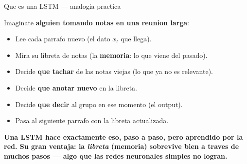 \documentclass[aspectratio=169, 11pt]{beamer}
\begin{document}
\begin{frame}[shrink]{Que es una LSTM --- analogia practica}
  \begin{tcolorbox}[colback=arcaGray, colframe=arcaRed, leftrule=3pt,
    boxrule=0pt, sharp corners, left=8pt, right=8pt, top=6pt, bottom=6pt]
    {\small\color{arcaDark}
    Imaginate \textbf{alguien tomando notas en una reunion larga}:\par}
    \vspace{4pt}
    \begin{itemize}\setlength{\itemsep}{4pt}
      \footnotesize
      \item Lee cada parrafo nuevo (el dato $x_t$ que llega).
      \item Mira su libreta de notas (la \textbf{memoria}: lo que viene del pasado).
      \item Decide \textbf{que tachar} de las notas viejas (lo que ya no es relevante).
      \item Decide \textbf{que anotar nuevo} en la libreta.
      \item Decide \textbf{que decir} al grupo en ese momento (el output).
      \item Pasa al siguiente parrafo con la libreta actualizada.
    \end{itemize}
  \end{tcolorbox}
  \vspace{6pt}
  \begin{tcolorbox}[colback=arcaRed!8, colframe=arcaRed, leftrule=3pt,
    boxrule=0pt, sharp corners, left=8pt, right=8pt, top=4pt, bottom=4pt]
    {\small\color{arcaDark}\bfseries
    Una LSTM hace exactamente eso, paso a paso, pero aprendido por la red.
    Su gran ventaja: la \emph{libreta} (memoria) sobrevive bien a traves de muchos pasos
    --- algo que las redes neuronales simples no logran.}
  \end{tcolorbox}
\end{frame}
\end{document}
